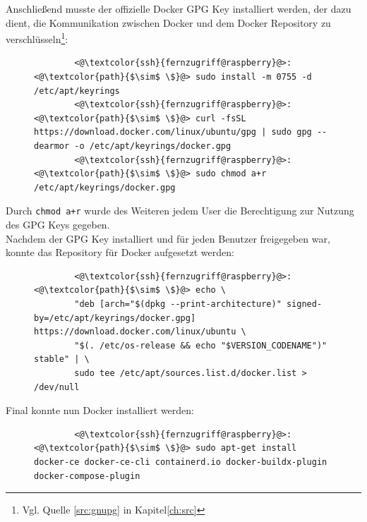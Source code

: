 \documentclass[a4paper, 12pt]{scrartcl}
\begin{document}
Anschließend musste der offizielle Docker GPG Key installiert werden, der dazu dient, die Kommunikation zwischen
Docker und dem Docker Repository zu verschlüsseln\footnote{Vgl. Quelle \ref{src:gnupg} in Kapitel\ref{ch:src}}:
\begin{figure}[H]
    \begin{mdframed}[backgroundcolor=bbg]
        \begin{lstlisting}
        <@\textcolor{ssh}{fernzugriff@raspberry}@>:<@\textcolor{path}{$\sim$ \$}@> sudo install -m 0755 -d /etc/apt/keyrings
        <@\textcolor{ssh}{fernzugriff@raspberry}@>:<@\textcolor{path}{$\sim$ \$}@> curl -fsSL https://download.docker.com/linux/ubuntu/gpg | sudo gpg --dearmor -o /etc/apt/keyrings/docker.gpg
        <@\textcolor{ssh}{fernzugriff@raspberry}@>:<@\textcolor{path}{$\sim$ \$}@> sudo chmod a+r /etc/apt/keyrings/docker.gpg
        \end{lstlisting}
    \end{mdframed}
    \label{lst:install_gpg}
\end{figure}
Durch \lstinline[basicstyle={\small\ttfamily\color{black}}]|chmod a+r| wurde des Weiteren jedem User die Berechtigung zur Nutzung des
GPG Keys gegeben.
\\
Nachdem der GPG Key installiert und für jeden Benutzer freigegeben war, konnte das Repository für Docker aufgesetzt werden:
\begin{figure}[H]
    \begin{mdframed}[backgroundcolor=bbg]
        \begin{lstlisting}
        <@\textcolor{ssh}{fernzugriff@raspberry}@>:<@\textcolor{path}{$\sim$ \$}@> echo \
        "deb [arch="$(dpkg --print-architecture)" signed-by=/etc/apt/keyrings/docker.gpg] https://download.docker.com/linux/ubuntu \
        "$(. /etc/os-release && echo "$VERSION_CODENAME")" stable" | \
        sudo tee /etc/apt/sources.list.d/docker.list > /dev/null
        \end{lstlisting}
    \end{mdframed}
    \label{lst:setup_docker_repo}
\end{figure}
Final konnte nun Docker installiert werden:
\begin{figure}[H]
    \begin{mdframed}[backgroundcolor=bbg]
        \begin{lstlisting}
        <@\textcolor{ssh}{fernzugriff@raspberry}@>:<@\textcolor{path}{$\sim$ \$}@> sudo apt-get install docker-ce docker-ce-cli containerd.io docker-buildx-plugin docker-compose-plugin
        \end{lstlisting}
    \end{mdframed}
    \label{lst:install_docker}
\end{figure}
\end{document}
